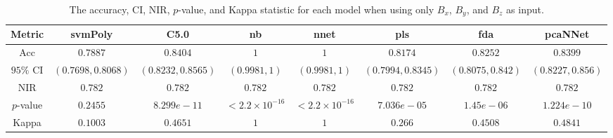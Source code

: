 \begin{table}[!ht]
	\centering
	\begin{tabular}{|c|c|c|c|c|c|c|c|}
		\hline
		Metric & svmPoly & C5.0 & nb & nnet & pls & fda & pcaNNet \\ \hline
		Acc & $0.7887$ & $0.8404$ & $1$ & $1$ & $0.8174$ & $0.8252$ & $0.8399$ \\ \hline
		$95\%$ CI & $(0.7698, 0.8068)$ & $(0.8232, 0.8565)$ & $(0.9981, 1)$ & $(0.9981, 1)$ & $(0.7994, 0.8345)$ & $(0.8075, 0.842)$ & $(0.8227, 0.856)$ \\ \hline
		NIR & $0.782$ & $0.782$ & $0.782$ & $0.782$ & $0.782$ & $0.782$ & $0.782$ \\ \hline
		$p$-value & $0.2455$ & $8.299e-11$ & $< 2.2 \times {10}^{-16}$ & $< 2.2 \times {10}^{-16}$ & $7.036e-05$ & $1.45e-06$ & $1.224e-10$ \\ \hline
		Kappa & $0.1003$ & $0.4651$ & $1$ & $1$ & $0.266$ & $0.4508$ & $0.4841$ \\ \hline
	\end{tabular}
	\caption{The accuracy, CI, NIR, $p$-value, and Kappa statistic for each model when using only $B_{x}$, $B_{y}$, and $B_{z}$ as input.}
	\label{tab:stats:coord}
\end{table}
